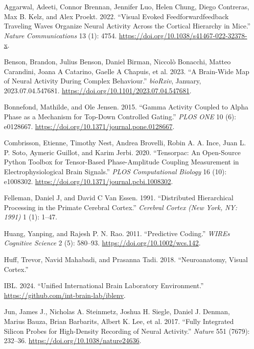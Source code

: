 \documentclass[
  letterpaper,
  DIV=11,
  numbers=noendperiod]{scrartcl}
\newlength{\cslhangindent}
\newenvironment{CSLReferences}[2] %
 {\begin{list}{}{%
  \setlength{\itemindent}{0pt}
  \setlength{\leftmargin}{0pt}
  \setlength{\parsep}{0pt}
  \ifodd #1
   \setlength{\leftmargin}{\cslhangindent}
   \setlength{\itemindent}{-1\cslhangindent}
  \fi
  \setlength{\itemsep}{#2\baselineskip}}}
 {\end{list}}
\begin{document}
\label{refs}
\begin{CSLReferences}{1}{0}
Aggarwal, Adeeti, Connor Brennan, Jennifer Luo, Helen Chung, Diego
Contreras, Max B. Kelz, and Alex Proekt. 2022. {``Visual Evoked
Feedforward{\textendash}feedback Traveling Waves Organize Neural
Activity Across the Cortical Hierarchy in Mice.''} \emph{Nature
Communications} 13 (1): 4754.
\url{https://doi.org/10.1038/s41467-022-32378-x}.

Benson, Brandon, Julius Benson, Daniel Birman, Niccolò Bonacchi, Matteo
Carandini, Joana A Catarino, Gaelle A Chapuis, et al. 2023. {``A
Brain-Wide Map of Neural Activity During Complex Behaviour.''}
\emph{bioRxiv}, January, 2023.07.04.547681.
\url{https://doi.org/10.1101/2023.07.04.547681}.

Bonnefond, Mathilde, and Ole Jensen. 2015. {``Gamma Activity Coupled to
Alpha Phase as a Mechanism for Top-Down Controlled Gating.''} \emph{PLOS
ONE} 10 (6): e0128667.
\url{https://doi.org/10.1371/journal.pone.0128667}.

Combrisson, Etienne, Timothy Nest, Andrea Brovelli, Robin A. A. Ince,
Juan L. P. Soto, Aymeric Guillot, and Karim Jerbi. 2020. {``Tensorpac:
An Open-Source Python Toolbox for Tensor-Based Phase-Amplitude Coupling
Measurement in Electrophysiological Brain Signals.''} \emph{PLOS
Computational Biology} 16 (10): e1008302.
\url{https://doi.org/10.1371/journal.pcbi.1008302}.

Felleman, Daniel J, and David C Van Essen. 1991. {``Distributed
Hierarchical Processing in the Primate Cerebral Cortex.''}
\emph{Cerebral Cortex (New York, NY: 1991)} 1 (1): 1--47.

Huang, Yanping, and Rajesh P. N. Rao. 2011. {``Predictive Coding.''}
\emph{WIREs Cognitive Science} 2 (5): 580--93.
\url{https://doi.org/10.1002/wcs.142}.

Huff, Trevor, Navid Mahabadi, and Prasanna Tadi. 2018. {``Neuroanatomy,
Visual Cortex.''}

IBL. 2024. {``Unified International Brain Laboratory Environment.''}
\url{https://github.com/int-brain-lab/iblenv}.

Jun, James J., Nicholas A. Steinmetz, Joshua H. Siegle, Daniel J.
Denman, Marius Bauza, Brian Barbarits, Albert K. Lee, et al. 2017.
{``Fully Integrated Silicon Probes for High-Density Recording of Neural
Activity.''} \emph{Nature} 551 (7679): 232--36.
\url{https://doi.org/10.1038/nature24636}.


\end{CSLReferences}
\end{document}
